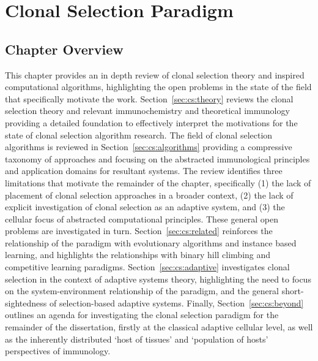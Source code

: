 %
%

\chapter{Clonal Selection Paradigm}
\label{chap:cs}

%
%
\section{Chapter Overview}
\label{sec:cs:overview}
This chapter provides an in depth review of clonal selection theory and inspired computational algorithms, highlighting the open problems in the state of the field that specifically motivate the work.
Section~\ref{sec:cs:theory} reviews the clonal selection theory and relevant immunochemistry and theoretical immunology providing a detailed foundation to effectively interpret the motivations for the state of clonal selection algorithm research. 
The field of clonal selection algorithms is reviewed in Section~\ref{sec:cs:algorithms} providing a compressive taxonomy of approaches and focusing on the abstracted immunological principles and application domains for resultant systems. The review identifies three limitations that motivate the remainder of the chapter, specifically (1) the lack of placement of clonal selection approaches in a broader context, (2) the lack of explicit investigation of clonal selection as an adaptive system, and (3) the cellular focus of abstracted computational principles.
These general open problems are investigated in turn. Section~\ref{sec:cs:related} reinforces the relationship of the paradigm with evolutionary algorithms and instance based learning, and highlights the relationships with binary hill climbing and competitive learning paradigms. Section~\ref{sec:cs:adaptive} investigates clonal selection in the context of adaptive systems theory, highlighting the need to focus on the system-environment relationship of the paradigm, and the general short-sightedness of selection-based adaptive systems. Finally, Section~\ref{sec:cs:beyond} outlines an agenda for investigating the clonal selection paradigm for the remainder of the dissertation, firstly at the classical adaptive cellular level, as well as the inherently distributed `host of tissues' and `population of hosts' perspectives of immunology.

